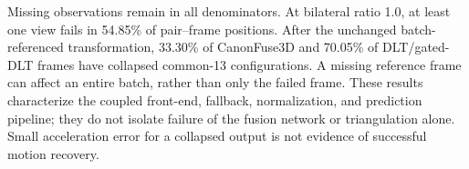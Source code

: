 Missing observations remain in all denominators. At bilateral ratio 1.0, at least one view fails in 54.85\% of pair--frame positions. After the unchanged batch-referenced transformation, 33.30\% of CanonFuse3D and 70.05\% of DLT/gated-DLT frames have collapsed common-13 configurations. A missing reference frame can affect an entire batch, rather than only the failed frame. These results characterize the coupled front-end, fallback, normalization, and prediction pipeline; they do not isolate failure of the fusion network or triangulation alone. Small acceleration error for a collapsed output is not evidence of successful motion recovery.

\FloatBarrier
